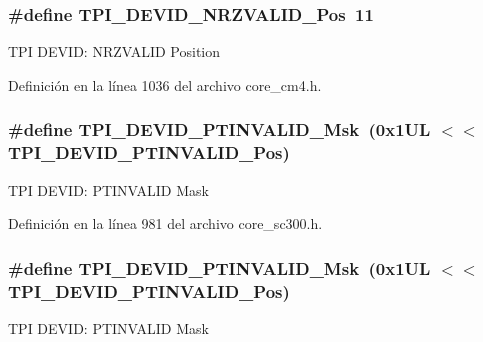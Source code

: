 \subsubsection[{\texorpdfstring{T\+P\+I\+\_\+\+D\+E\+V\+I\+D\+\_\+\+N\+R\+Z\+V\+A\+L\+I\+D\+\_\+\+Pos}{TPI_DEVID_NRZVALID_Pos}}]{\setlength{\rightskip}{0pt plus 5cm}\#define T\+P\+I\+\_\+\+D\+E\+V\+I\+D\+\_\+\+N\+R\+Z\+V\+A\+L\+I\+D\+\_\+\+Pos~11}\hypertarget{group___c_m_s_i_s___t_p_i_ga9f46cf1a1708575f56d6b827766277f4}{}\label{group___c_m_s_i_s___t_p_i_ga9f46cf1a1708575f56d6b827766277f4}
T\+PI D\+E\+V\+ID\+: N\+R\+Z\+V\+A\+L\+ID Position 

Definición en la línea 1036 del archivo core\+\_\+cm4.\+h.

\subsubsection[{\texorpdfstring{T\+P\+I\+\_\+\+D\+E\+V\+I\+D\+\_\+\+P\+T\+I\+N\+V\+A\+L\+I\+D\+\_\+\+Msk}{TPI_DEVID_PTINVALID_Msk}}]{\setlength{\rightskip}{0pt plus 5cm}\#define T\+P\+I\+\_\+\+D\+E\+V\+I\+D\+\_\+\+P\+T\+I\+N\+V\+A\+L\+I\+D\+\_\+\+Msk~(0x1\+U\+L $<$$<$ T\+P\+I\+\_\+\+D\+E\+V\+I\+D\+\_\+\+P\+T\+I\+N\+V\+A\+L\+I\+D\+\_\+\+Pos)}\hypertarget{group___c_m_s_i_s___t_p_i_ga1ca84d62243e475836bba02516ba6b97}{}\label{group___c_m_s_i_s___t_p_i_ga1ca84d62243e475836bba02516ba6b97}
T\+PI D\+E\+V\+ID\+: P\+T\+I\+N\+V\+A\+L\+ID Mask 

Definición en la línea 981 del archivo core\+\_\+sc300.\+h.

\subsubsection[{\texorpdfstring{T\+P\+I\+\_\+\+D\+E\+V\+I\+D\+\_\+\+P\+T\+I\+N\+V\+A\+L\+I\+D\+\_\+\+Msk}{TPI_DEVID_PTINVALID_Msk}}]{\setlength{\rightskip}{0pt plus 5cm}\#define T\+P\+I\+\_\+\+D\+E\+V\+I\+D\+\_\+\+P\+T\+I\+N\+V\+A\+L\+I\+D\+\_\+\+Msk~(0x1\+U\+L $<$$<$ T\+P\+I\+\_\+\+D\+E\+V\+I\+D\+\_\+\+P\+T\+I\+N\+V\+A\+L\+I\+D\+\_\+\+Pos)}\hypertarget{group___c_m_s_i_s___t_p_i_ga1ca84d62243e475836bba02516ba6b97}{}\label{group___c_m_s_i_s___t_p_i_ga1ca84d62243e475836bba02516ba6b97}
T\+PI D\+E\+V\+ID\+: P\+T\+I\+N\+V\+A\+L\+ID Mask 

